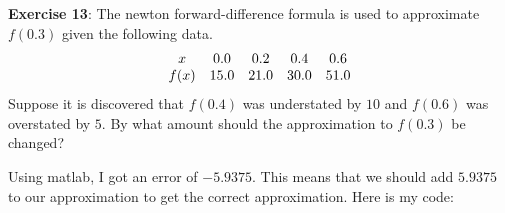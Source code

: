\documentclass{article}
\begin{document}
\textbf{Exercise 13}: The newton forward-difference formula is used to approximate $f(0.3)$ given the following data.
    \begin{align*}
        \begin{array}{ c c c c c }
            x    & 0.0  & 0.2  & 0.4  & 0.6  \\
            f(x) & 15.0 & 21.0 & 30.0 & 51.0   
        \end{array}
    \end{align*}
Suppose it is discovered that $f(0.4)$ was understated by $10$ and $f(0.6)$ was overstated by $5$. By what amount should the approximation to $f(0.3)$ be changed?
    \begin{answer}
        Using matlab, I got an error of $-5.9375$. This means that we should add $5.9375$ to our approximation to get the correct approximation. Here is my code:
        \inputminted{matlab}{code/NewtonForwardDifference/NewtonForwardDifference.m}
        \inputminted{matlab}{code/NewtonForwardDifference/forwardPoly.m}
        \inputminted{matlab}{code/script4.m}
    \end{answer}
    
\end{document}
